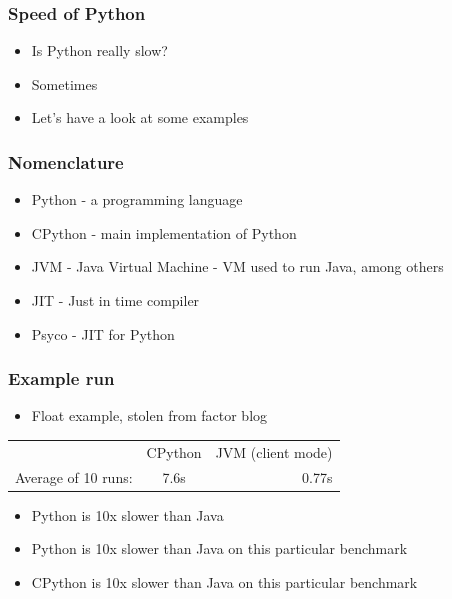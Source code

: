 \documentclass[utf8x]{beamer}
\begin{document}
\begin{frame}
  \frametitle{Speed of Python}
  \begin{itemize}
    \item Is Python really slow?
      \pause
    \item Sometimes
      \pause
    \item Let's have a look at some examples
  \end{itemize}

\end{frame}

\begin{frame}
  \frametitle{Nomenclature}
  \begin{itemize}
    \item Python - a programming language
    \item CPython - main implementation of Python
    \item JVM - Java Virtual Machine - VM used to run Java, among others
    \item JIT - Just in time compiler
    \item Psyco - JIT for Python
  \end{itemize}
\end{frame}

\begin{frame}
  \frametitle{Example run}
  \begin{itemize}
    \item Float example, stolen from factor blog
  \end{itemize}
  \vspace{.5cm}
  \begin{tabular}{| l | c | r |}
    \hline
    & CPython & JVM (client mode) \\
    Average of 10 runs: & 7.6s & 0.77s \\
    \hline
  \end{tabular}
  \vspace{.5cm}
  \pause
  \begin{itemize}
    \item Python is 10x slower than Java
      \pause
    \item Python is 10x slower than Java on this particular benchmark
      \pause
    \item CPython is 10x slower than Java on this particular benchmark
  \end{itemize}
\end{frame}
\end{document}
